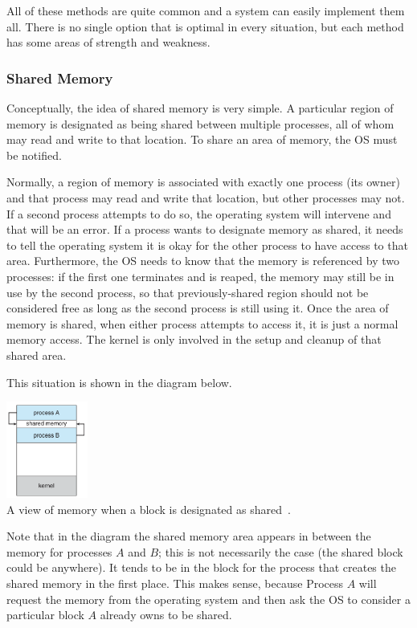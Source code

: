 All of these methods are quite common and a system can easily implement them all. There is no single option that is optimal in every situation, but each method has some areas of strength and weakness.

\subsubsection*{Shared Memory}
Conceptually, the idea of shared memory is very simple. A particular region of memory is designated as being shared between multiple processes, all of whom may read and write to that location. To share an area of memory, the OS must be notified.

Normally, a region of memory is associated with exactly one process (its owner) and that process may read and write that location, but other processes may not. If a second process attempts to do so, the operating system will intervene and that will be an error. If a process wants to designate memory as shared, it needs to tell the operating system it is okay for the other process to have access to that area. Furthermore, the OS needs to know that the memory is referenced by two processes: if the first one terminates and is reaped, the memory may still be in use by the second process, so that previously-shared region should not be considered free as long as the second process is still using it. Once the area of memory is shared, when either process attempts to access it, it is just a normal memory access. The kernel is only involved in the setup and cleanup of that shared area.

This situation is shown in the diagram below. 

\begin{center}
	\includegraphics[width=0.2\textwidth]{images/shared-memory.png}\\
	A view of memory when a block is designated as shared~\cite{osc}.
\end{center}

Note that in the diagram the shared memory area appears in between the memory for processes $A$ and $B$; this is not necessarily the case (the shared block could be anywhere). It tends to be in the block for the process that creates the shared memory in the first place. This makes sense, because Process $A$ will request the memory from the operating system and then ask the OS to consider a particular block $A$ already owns to be shared.

